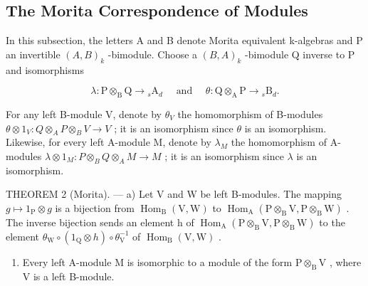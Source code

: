 \subsection{The Morita Correspondence of Modules}

In this subsection, the letters A and B denote Morita equivalent k-algebras and P an invertible \((A,B)_{k}\) -bimodule. Choose a \((B,A)_{k}\) -bimodule Q inverse to P and isomorphisms

\[
\lambda : \mathrm{P} \otimes_ {\mathrm{B}} \mathrm{Q} \rightarrow {} _ {s} \mathrm{A} _ {d} \quad \text { and } \quad \theta : \mathrm{Q} \otimes_ {\mathrm{A}} \mathrm{P} \rightarrow {} _ {s} \mathrm{B} _ {d}.
\]

For any left B-module V, denote by \(\theta_{V}\) the homomorphism of B-modules \(\theta\otimes1_{V}:Q\otimes_{A}P\otimes_{B}V\to V\) ; it is an isomorphism since \(\theta\) is an isomorphism. Likewise, for every left A-module M, denote by \(\lambda_{M}\) the homomorphism of A-modules \(\lambda\otimes1_{M}:P\otimes_{B}Q\otimes_{A}M\to M\) ; it is an isomorphism since \(\lambda\) is an isomorphism.

THEOREM 2 (Morita). --- a) Let V and W be left B-modules. The mapping \(g \mapsto 1_{\mathrm{P}} \otimes g\) is a bijection from \(\operatorname{Hom}_{\mathrm{B}}(\mathrm{V}, \mathrm{W})\) to \(\operatorname{Hom}_{\mathrm{A}}(\mathrm{P} \otimes_{\mathrm{B}} \mathrm{V}, \mathrm{P} \otimes_{\mathrm{B}} \mathrm{W})\) . The inverse bijection sends an element h of \(\operatorname{Hom}_{\mathrm{A}}(\mathrm{P} \otimes_{\mathrm{B}} \mathrm{V}, \mathrm{P} \otimes_{\mathrm{B}} \mathrm{W})\) to the element \(\theta_{\mathrm{W}} \circ (1_{\mathrm{Q}} \otimes h) \circ \theta_{\mathrm{V}}^{-1}\) of \(\operatorname{Hom}_{\mathrm{B}}(\mathrm{V}, \mathrm{W})\) .

\begin{enumerate}
\def\labelenumi{\alph{enumi})}
\setcounter{enumi}{1}
\tightlist
\item
  Every left A-module M is isomorphic to a module of the form \(\mathrm{P} \otimes_{\mathrm{B}} \mathrm{V}\) , where V is a left B-module.
\end{enumerate}

